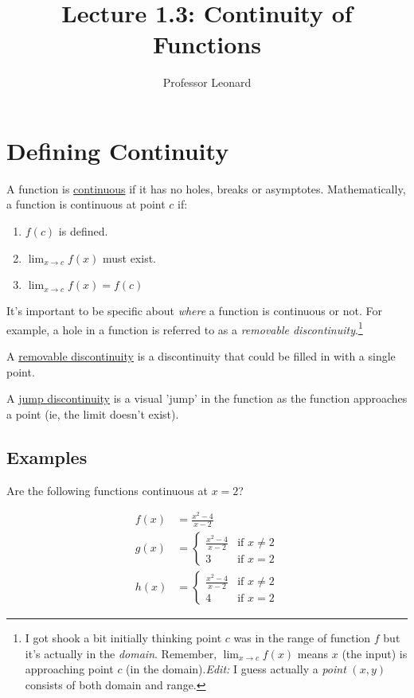\documentclass{article}
\begin{document}
\title{Lecture 1.3: Continuity of Functions}
\author{Professor Leonard}
\maketitle

\section{Defining Continuity}

\begin{definition}
A function is \underline{continuous} if it has no holes,
breaks or asymptotes. Mathematically, a function is continuous at point $c$ if:
\begin{enumerate}
	\item $f(c)$ is defined.
	\item $\lim_{x\to c} f(x)$ must exist.
	\item $\lim_{x\to c} f(x) = f(c)$
\end{enumerate}
\end{definition}

It's important to be specific about \emph{where} a function is continuous or not. For
example, a hole in a function is referred to as a \emph{removable discontinuity}.\footnote{I got shook a bit initially thinking point $c$ was in the range of function $f$ but it's actually in the \emph{domain}. Remember, $\lim_{x\to c} f(x)$ means $x$ (the input) is approaching point $c$ (in the domain).\emph{Edit:} I guess actually a \emph{point} $(x, y)$ consists of both domain and range.}

\begin{definition}
A \underline{removable discontinuity} is a discontinuity that could be filled in with a
single point.
\end{definition}

\begin{definition}
A \underline{jump discontinuity} is a visual 'jump' in the function as the function
approaches a point (ie, the limit doesn't exist).
\end{definition}

\subsection{Examples}

Are the following functions continuous at $x=2$?

\begin{align*}
    f(x) &= \frac{x^2 - 4}{x-2}\\
    g(x) &= \begin{cases}
        \frac{x^2- 4}{x-2} & \text{if } x \neq 2\\
        3 & \text{if } x = 2
    \end{cases}\\
        h(x) &= \begin{cases}
            \frac{x^2 - 4}{x-2} & \text{if } x \neq 2\\
            4 & \text{if } x = 2
        \end{cases}
\end{align*}
\end{document}

